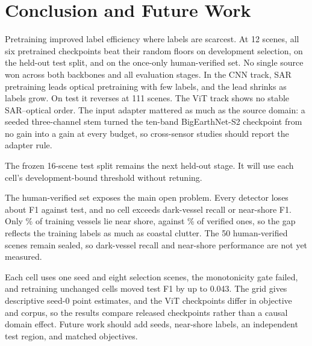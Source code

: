 \section{Conclusion and Future Work}

Pretraining improved label efficiency where labels are scarcest. At 12
scenes, all six pretrained checkpoints beat their random floors on
development selection\ifHevTestComplete, on the held-out test split\fi\ifHevFinalEval,
and on the once-only human-verified set\fi. No single source won across both
backbones and all evaluation stages. In the CNN track, SAR pretraining leads
optical pretraining with few labels, and the lead shrinks as labels
grow.\ifHevTestComplete{} On test it reverses at 111 scenes.\fi{} The ViT
track shows no stable SAR--optical order. The input adapter mattered as much as the source domain: a seeded
three-channel stem turned the ten-band BigEarthNet-S2 checkpoint from no
gain into a gain at every budget, so cross-sensor studies should report the
adapter rule.

\ifHevTestComplete\else
The frozen 16-scene test split remains the next held-out stage. It will use
each cell's development-bound threshold without retuning.
\fi

\ifHevFinalEval
The human-verified set exposes the main open problem. Every detector loses
about \HevFinalMeanTestGap{} F1 against test, and no cell exceeds
\HevFinalDarkRecallMax{} dark-vessel recall or \HevFinalNearShoreFMax{}
near-shore F1. Only \HevTrainNearShorePct\% of training vessels lie near
shore, against \HevFinalNearShorePct\% of verified ones, so the gap reflects
the training labels as much as coastal clutter.
\else
The 50 human-verified scenes remain sealed, so dark-vessel recall and
near-shore performance are not yet measured.
\fi

Each cell uses one seed and eight selection scenes\ifHevTestComplete, the
monotonicity gate failed, and retraining unchanged cells moved test F1 by up
to 0.043\fi. The grid gives descriptive seed-0 point estimates, and the ViT
checkpoints differ in objective and corpus, so the results compare released
checkpoints rather than a causal domain effect. Future work should add seeds,
near-shore labels, an independent test region, and matched objectives.
